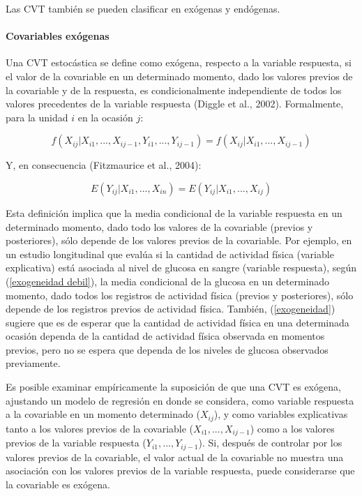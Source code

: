 \documentclass[spanish]{article}
\numberwithin{figure}{subsection}
\numberwithin{equation}{subsection}
\numberwithin{table}{subsection}
\begin{document}
Las CVT también se pueden clasificar en exógenas y endógenas.

\paragraph{Covariables exógenas} \mbox{}

Una CVT estocástica se define como exógena, respecto a la variable respuesta, si
el valor de la covariable en un determinado momento, dado los valores previos de
la covariable y de la respuesta, es condicionalmente independiente de todos los
valores precedentes de la variable respuesta (Diggle et al., 2002). Formalmente,
para la unidad $i$ en la ocasión $j$:  

\begin{equation}
	\label{exogeneidad}
	f(X_{ij}|X_{i1}, ..., X_{ij-1}, Y_{i1}, ..., Y_{ij-1}) =
	f(X_{ij}|X_{i1}, ..., X_{ij-1})
\end{equation}

Y, en consecuencia (Fitzmaurice et al., 2004):

\begin{equation}
	\label{exogeneidad debil}
	E(Y_{ij}|X_{i1}, ..., X_{in}) = E(Y_{ij}|X_{i1}, ..., X_{ij})
\end{equation}

Esta definición implica que la media condicional de la variable respuesta en un
determinado momento, dado todo los valores de la covariable (previos y
posteriores), sólo depende de los valores previos de la covariable. Por ejemplo,
en un estudio longitudinal que evalúa si la cantidad de actividad física
(variable explicativa) está asociada al nivel de glucosa en sangre (variable
respuesta), según (\ref{exogeneidad debil}), la media condicional de la glucosa
en un determinado momento, dado todos los registros de actividad física (previos
y posteriores), sólo depende de los registros previos de actividad física.
También, (\ref{exogeneidad}) sugiere que es de esperar que la cantidad de
actividad física en una determinada ocasión dependa de la cantidad de actividad
física observada en momentos previos, pero no se espera que dependa de los niveles
de glucosa observados previamente.

Es posible examinar empíricamente la suposición de que una CVT es exógena,
ajustando un modelo de regresión en donde se considera, como variable respuesta
a la covariable en un momento determinado ($X_{ij}$), y como variables
explicativas tanto a los valores previos de la covariable ($X_{i1}, ...,
X_{ij-1}$) como a los valores previos de la variable respuesta ($Y_{i1}, ...,
Y_{ij-1}$). Si, después de controlar por los valores previos de la covariable,
el valor actual de la covariable no muestra una asociación con los valores
previos de la variable respuesta, puede considerarse que la covariable es
exógena.
\end{document}
